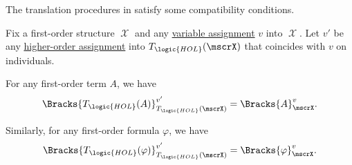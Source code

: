 \begin{proposition}\label{thm:fol_to_hol_translation}
  The translation procedures in  satisfy some compatibility conditions.

  Fix a first-order structure \( \mscrX \) and any \hyperref[def:fol_variable_assignment]{variable assignment} \( v \) into \( \mscrX \). Let \( v' \) be any \hyperref[def:hol_variable_assignment]{higher-order assignment} into \( T_{\logic{HOL}}(\mscrX) \) that coincides with \( v \) on individuals.

  \begin{thmenum}
     For any first-order term \( A \), we have
    \begin{equation*}
      \Bracks{T_{\logic{HOL}}(A)}_{T_{\logic{HOL}}(\mscrX)}^{v'} = \Bracks{A}_\mscrX^v.
    \end{equation*}

     Similarly, for any first-order formula \( \varphi \), we have
    \begin{equation*}
      \Bracks{T_{\logic{HOL}}(\varphi)}_{T_{\logic{HOL}}(\mscrX)}^{v'} = \Bracks{\varphi}_\mscrX^v.
    \end{equation*}
  \end{thmenum}
\end{proposition}
